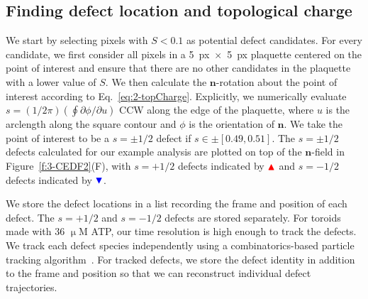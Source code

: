 \subsection{Finding defect location and topological charge}
We start by selecting pixels with $S < 0.1$ as potential defect candidates.
For every candidate, we first consider all pixels in a 5~px~$\times$~5~px plaquette centered on the point of interest and ensure that there are no other candidates in the plaquette with a lower value of $S$.
We then calculate the $\mathbf{n}$-rotation about the point of interest according to Eq.~\ref{eq:2-topCharge}.
Explicitly, we numerically evaluate $s = (1 / 2 \pi)(\oint \partial\phi / \partial u)$ CCW along the edge of the plaquette, where $u$ is the arclength along the square contour and $\phi$ is the orientation of $\mathbf{n}$.
We take the point of interest to be a $s = \pm 1/2$ defect if $s \in \pm [0.49,0.51]$.
The $s=\pm1/2$ defects calculated for our example analysis are plotted on top of the $\mathbf{n}$-field in Figure~\ref{f:3-CEDF2}(F), with $s = +1/2$ defects indicated by ${\color{red} \blacktriangle } $  and $s = -1/2$ defects indicated by ${ \color{blue} \blacktriangledown } $.

We store the defect locations in a list recording the frame and position of each defect.
The $s = +1/2$ and $s = -1/2$ defects are stored separately.
For toroids made with 36 $\upmu$M ATP, our time resolution is high enough to track the defects.
We track each defect species independently using a combinatorics-based particle tracking algorithm~\cite{RN54}.
For tracked defects, we store the defect identity in addition to the frame and position so that we can reconstruct individual defect trajectories.


